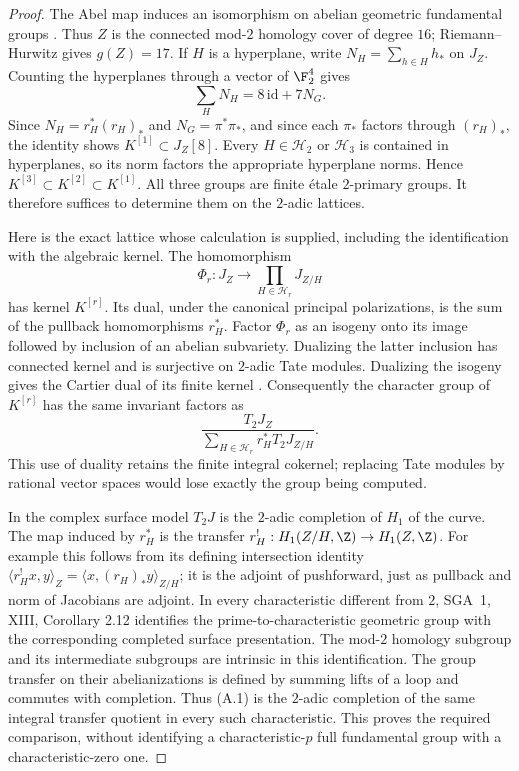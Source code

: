 \begin{proof}
The Abel map induces an isomorphism on abelian geometric
fundamental groups \citep[III, Proposition 9.1]{A_Milne2008}.
Thus $Z$ is the connected mod-$2$ homology cover of degree $16$;
Riemann--Hurwitz gives $g(Z)=17$. If $H$ is a hyperplane, write
$N_H=\sum_{h\in H}h_*$ on $J_Z$. Counting the hyperplanes
through a vector of $\F_2^4$ gives
\[
 \sum_H N_H=8\,\mathrm{id}+7N_G.
\]
Since $N_H=r_H^*(r_H)_*$ and $N_G=\pi^*\pi_*$, and since each
$\pi_*$ factors through $(r_H)_*$, the identity shows
$K^{[1]}\subset J_Z[8]$. Every $H\in\mathcal H_2$ or
$\mathcal H_3$ is contained in hyperplanes, so its norm factors
the appropriate hyperplane norms. Hence
$K^{[3]}\subset K^{[2]}\subset K^{[1]}$. All three groups are
finite \'etale $2$-primary groups. It therefore suffices to determine
them on the $2$-adic lattices.

Here is the exact lattice whose calculation is supplied, including
the identification with the algebraic kernel. The homomorphism
\[
 \Phi_r:J_Z\longrightarrow\prod_{H\in\mathcal H_r}J_{Z/H}
\]
has kernel $K^{[r]}$. Its dual, under the canonical principal
polarizations, is the sum of the pullback homomorphisms $r_H^*$.
Factor $\Phi_r$ as an isogeny onto its image followed by inclusion
of an abelian subvariety. Dualizing the latter inclusion has connected
kernel and is surjective on $2$-adic Tate modules. Dualizing the
isogeny gives the Cartier dual of its finite kernel
\citep[I, Theorem 9.1]{A_Milne2008}. Consequently the character
group of $K^{[r]}$ has the same invariant factors as
\[
 \frac{T_2J_Z}{\sum_{H\in\mathcal H_r}r_H^*T_2J_{Z/H}}.       \tag{A.1}
\]
This use of duality retains the finite integral cokernel; replacing
Tate modules by rational vector spaces would lose exactly the group
being computed.

In the complex surface model $T_2J$ is the $2$-adic completion of
$H_1$ of the curve. The map induced by $r_H^*$ is the transfer
$r_H^!:H_1(Z/H,\Z)\to H_1(Z,\Z)$. For example this follows
from its defining intersection identity
$\langle r_H^!x,y\rangle_Z=\langle x,(r_H)_*y\rangle_{Z/H}$;
it is the adjoint of pushforward, just as pullback and norm of
Jacobians are adjoint. In every characteristic different from $2$,
SGA~1, XIII, Corollary 2.12 identifies the prime-to-characteristic
geometric group with the corresponding completed surface
presentation. The mod-$2$ homology subgroup and its intermediate
subgroups are intrinsic in this identification. The group transfer
on their abelianizations is defined by summing lifts of a loop and
commutes with completion. Thus (A.1) is the $2$-adic completion of
the same integral transfer quotient in every such characteristic.
This proves the required comparison, without identifying a
characteristic-$p$ full fundamental group with a characteristic-zero
one.


\end{proof}
